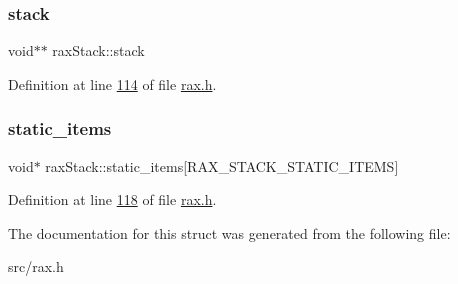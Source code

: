 \mbox{\label{structraxStack_a3a482a02da636a9c844e1c2bcf0c0e8e}} 
\subsubsection{\texorpdfstring{stack}{stack}}
{\footnotesize\ttfamily void$\ast$$\ast$ rax\+Stack\+::stack}



Definition at line \hyperlink{rax_8h_source_l00114}{114} of file \hyperlink{rax_8h_source}{rax.\+h}.

\mbox{\label{structraxStack_a8077bcdde5a027aac7e931cf41d12082}} 
\subsubsection{\texorpdfstring{static\+\_\+items}{static\_items}}
{\footnotesize\ttfamily void$\ast$ rax\+Stack\+::static\+\_\+items\mbox{[}R\+A\+X\+\_\+\+S\+T\+A\+C\+K\+\_\+\+S\+T\+A\+T\+I\+C\+\_\+\+I\+T\+E\+MS\mbox{]}}



Definition at line \hyperlink{rax_8h_source_l00118}{118} of file \hyperlink{rax_8h_source}{rax.\+h}.



The documentation for this struct was generated from the following file\+:\begin{DoxyCompactItemize}
\item 
src/rax.\+h\end{DoxyCompactItemize}
